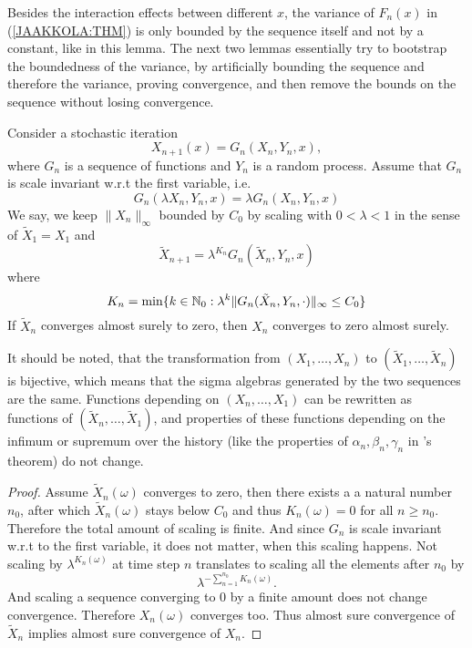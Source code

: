 Besides the interaction effects between different \(x\), the variance of \(F_n(x)\) in (\ref{JAAKKOLA:THM}) is only bounded by the sequence itself and not by a constant, like in this lemma. The next two lemmas essentially try to bootstrap the boundedness of the variance, by artificially bounding the sequence and therefore the variance, proving convergence, and then remove the bounds on the sequence without losing convergence.

\begin{lemma}\label{scaling lemma}
    Consider a stochastic iteration 
    \[
        X_{n+1}(x)=G_n(X_n, Y_n,x),
    \]
    where \(G_n\) is a sequence of functions and \(Y_n\) is a random process. Assume that \(G_n\) is scale invariant w.r.t the first variable, i.e.
    \[
        G_n(\lambda X_n, Y_n, x)=\lambda G_n(X_n,Y_n,x)
    \]
    We say, we keep \(\|X_n\|_\infty\) bounded by \(C_0\) by scaling with \(0<\lambda<1\) in the sense of \(\tilde{X}_1=X_1\) and
    \[
        \tilde{X}_{n+1} =\lambda^{K_n} G_n(\tilde{X}_n, Y_n,x)
    \]
    where
    \[
        K_n=\min\{k\in\mathbb{N}_0 : \lambda^k \|G_n(\tilde{X}_n, Y_n,\cdot)\|_\infty \le C_0\}
    \]
    If \(\tilde{X}_n\) converges almost surely to zero, then \(X_n\) converges to zero almost surely. 
\end{lemma}
\begin{remark}
    It should be noted, that the transformation from \((X_1, \dots,  X_n)\) to \((\tilde{X}_1, \dots, \tilde{X}_n)\) is bijective, which means that the sigma algebras generated by the two sequences are the same. Functions depending on \((X_n,\dots,X_1)\) can be rewritten as functions of \((\tilde{X}_n,\dots,\tilde{X}_1)\), and properties of these functions depending on the infimum or supremum over the history (like the properties of \(\alpha_n,\beta_n,\gamma_n\) in \citeauthor{dvoretzkyStochasticApproximation1956}'s theorem) do not change.   
\end{remark}
\begin{proof}
    Assume \(\tilde{X}_n(\omega)\) converges to zero, then there exists a a natural number \(n_0\), after which \(\tilde{X}_n(\omega)\) stays below \(C_0\) and thus \(K_n(\omega)=0\) for all \(n\ge n_0\). Therefore the total amount of scaling is finite. And since \(G_n\) is scale invariant w.r.t to the first variable, it does not matter, when this scaling happens. Not scaling by \(\lambda^{K_n(\omega)}\) at time step \(n\) translates to scaling all the elements after \(n_0\) by 
    \[
        \lambda^{-\sum_{n=1}^{n_0}K_n(\omega)}.
    \] 
    And scaling a sequence converging to 0 by a finite amount does not change convergence. Therefore \(X_n(\omega)\) converges too. Thus almost sure convergence of \(\tilde{X}_n\) implies almost sure convergence of \(X_n\).
\end{proof}

